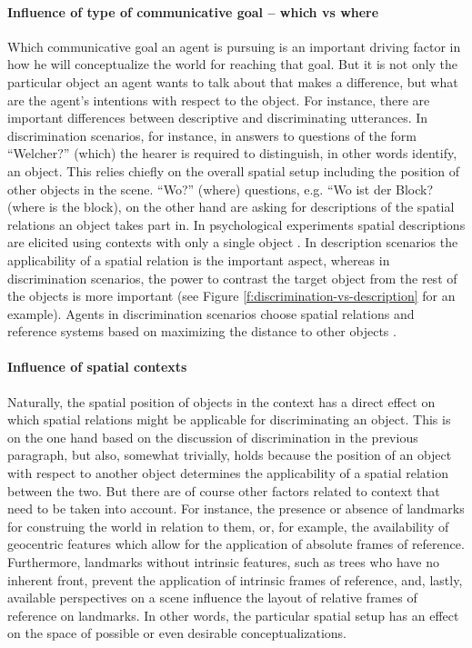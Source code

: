 \paragraph*{Influence of type of communicative goal -- which vs where}
Which communicative goal an agent is pursuing is an important 
driving factor in how he will conceptualize the world for reaching 
that goal. But it is not only the particular object an agent wants to talk 
about that makes a difference, but what are the agent's intentions with 
respect to the object. For instance, there are important differences 
between descriptive and discriminating utterances. 
In discrimination scenarios, for instance, in answers to questions 
of the form ``Welcher?'' (which) the hearer is required to distinguish, in 
other words identify, an object. This relies chiefly on the overall 
spatial setup including the position of other objects 
in the scene. ``Wo?'' (where) questions, e.g. ``Wo ist der Block? (where is the block),  
on the other hand are asking for descriptions of the spatial relations an object takes 
part in. In psychological experiments
spatial descriptions are elicited using contexts with only a 
single object \citep{levinson2003space}. 
In description scenarios the applicability
of a spatial relation is the important aspect, 
whereas in discrimination scenarios, the power to contrast the
target object from the rest of the objects is more important 
\citep{tenbrink2005identifying} 
(see Figure \ref{f:discrimination-vs-description} for an example). 
Agents in discrimination scenarios choose spatial relations and
reference systems based on maximizing the distance to other objects
\citep{herskovits1986language}.

\paragraph*{Influence of spatial contexts}
Naturally, the spatial position of objects in the context has a
direct effect on which spatial relations might be applicable for
discriminating an object. This is on the one hand based on
the discussion of discrimination in the previous paragraph, 
but also, somewhat trivially, holds because the position of an 
object with respect to another object determines the applicability 
of a spatial relation between the two. But there are of course other factors
related to context that need to be taken into account.
For instance, the presence or absence of landmarks for construing the world
in relation to them, or, for example, the availability of geocentric
features which allow for the application of absolute frames of 
reference. Furthermore, landmarks without intrinsic features, such 
as trees who have no inherent front, 
prevent the application of intrinsic frames of reference, and, 
lastly, available perspectives on a scene influence the layout
of relative frames of reference on landmarks. In other words,
the particular spatial setup has an effect on the 
space of possible or even desirable conceptualizations.


